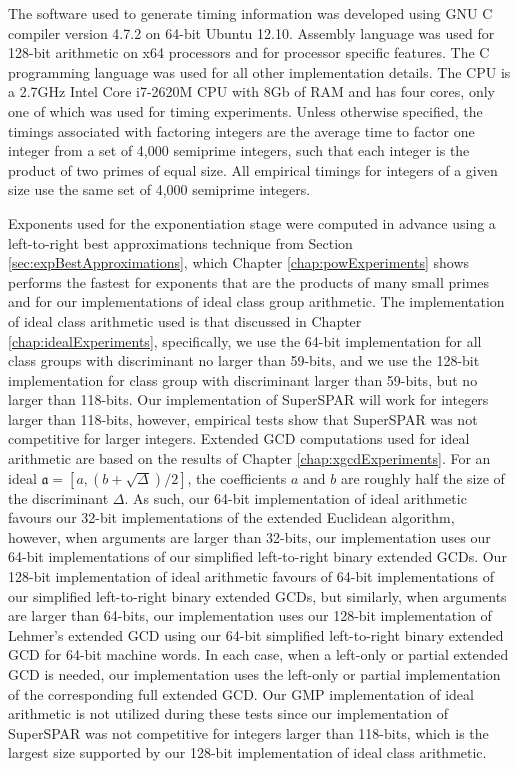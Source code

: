 \documentclass{ucalgthes1}
\theoremstyle{definition}
\newcommand{\ideal}{\mathfrak}
\newcommand{\compiler}{GNU C compiler version 4.7.2}
\newcommand{\cpu}{2.7GHz Intel Core i7-2620M CPU}
\begin{document}
The software used to generate timing information was developed using \compiler{} on 64-bit Ubuntu 12.10.  Assembly language was used for 128-bit arithmetic on x64 processors and for processor specific features.  The C programming language was used for all other implementation details.  The CPU is a \cpu{} with 8Gb of RAM and has four cores, only one of which was used for timing experiments.  Unless otherwise specified, the timings associated with factoring integers are the average time to factor one integer from a set of 4,000 semiprime integers, such that each integer is the product of two primes of equal size.  All empirical timings for integers of a given size use the same set of 4,000 semiprime integers.

Exponents used for the exponentiation stage were computed in advance using a left-to-right best approximations technique from Section \ref{sec:expBestApproximations}, which Chapter \ref{chap:powExperiments} shows performs the fastest for exponents that are the products of many small primes and for our implementations of ideal class group arithmetic.  The implementation of ideal class arithmetic used is that discussed in Chapter \ref{chap:idealExperiments}, specifically, we use the 64-bit implementation for all class groups with discriminant no larger than 59-bits, and we use the 128-bit implementation for class group with discriminant larger than 59-bits, but no larger than 118-bits.  Our implementation of SuperSPAR will work for integers larger than 118-bits, however, empirical tests show that SuperSPAR was not competitive for larger integers.   Extended GCD computations used for ideal arithmetic are based on the results of Chapter \ref{chap:xgcdExperiments}.  For an ideal $\ideal a = [a, (b + \sqrt\Delta)/2]$, the coefficients $a$ and $b$ are roughly half the size of the discriminant $\Delta$.  As such, our 64-bit implementation of ideal arithmetic favours our 32-bit implementations of the extended Euclidean algorithm, however, when arguments are larger than 32-bits, our implementation uses our 64-bit implementations of our simplified left-to-right binary extended GCDs.  Our 128-bit implementation of ideal arithmetic favours of 64-bit implementations of our simplified left-to-right binary extended GCDs, but similarly, when arguments are larger than 64-bits, our implementation uses our 128-bit implementation of Lehmer's extended GCD using our 64-bit simplified left-to-right binary extended GCD for 64-bit machine words.   In each case, when a left-only or partial extended GCD is needed, our implementation uses the left-only or partial implementation of the corresponding full extended GCD.  Our GMP implementation of ideal arithmetic is not utilized during these tests since our implementation of SuperSPAR was not competitive for integers larger than 118-bits, which is the largest size supported by our 128-bit implementation of ideal class arithmetic.
\end{document}
